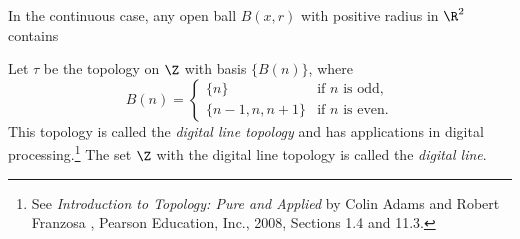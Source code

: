 In the continuous case, any open ball $B(x,r)$ with positive radius in $\R^2$ contains 

Let  $\tau$ be the topology on $\Z$ with basis $\{B(n)\}$, where 
\[B(n) = \begin{cases} \{n\}	&\text{if $n$ is odd}, \\ \{n-1,n,n+1\}	&\text{if $n$ is even}. \end{cases}\]
This topology is called the \emph{digital line topology} and has applications in digital processing.\footnote{See \emph{Introduction to Topology: Pure and Applied} by Colin Adams and Robert Franzosa , Pearson Education, Inc., 2008,  Sections 1.4 and 11.3.} The set $\Z$ with the digital line topology is called the \emph{digital line}. 


